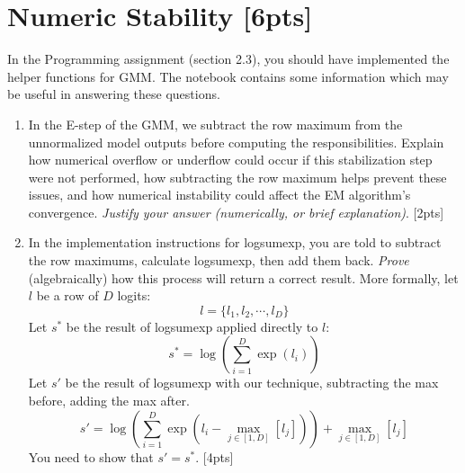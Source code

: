 \section{Numeric Stability [6pts]}
In the Programming assignment (section 2.3), you should have implemented the helper functions for GMM. The notebook contains some information which may be useful in answering these questions.

\begin{enumerate}[label=\alph*.]

    \item In the E-step of the GMM, we subtract the row maximum from the unnormalized model outputs before computing the responsibilities. Explain how numerical overflow or underflow could occur if this stabilization step were not performed, how subtracting the row maximum helps prevent these issues, and how numerical instability could affect the EM algorithm's convergence.
 \emph{Justify your answer (numerically, or brief explanation)}. [2pts]

    \item In the implementation instructions for \textsf{logsumexp}, you are told to subtract the row maximums, calculate \textsf{logsumexp}, then add them back. \emph{Prove} (algebraically) how this process will return a correct result. More formally, let $l$ be a row of $D$ logits:
    $$l = \{l_1, l_2, \cdots, l_D\}$$
    Let $s^*$ be the result of logsumexp applied directly to $l$:
    $$s^* = \log \left( \sum_{i=1}^D \exp(l_i) \right)$$
    Let $s'$ be the result of logsumexp with our technique, subtracting the max before, adding the max after.
    $$s' = \log \left( \sum_{i=1}^D \exp\left(l_i - \max_{j\in[1,D]}[l_j]\right) \right) + \max_{j\in[1,D]}[l_j]$$
    You need to show that $s'=s^*$. [4pts]
\end{enumerate}
\newpage
